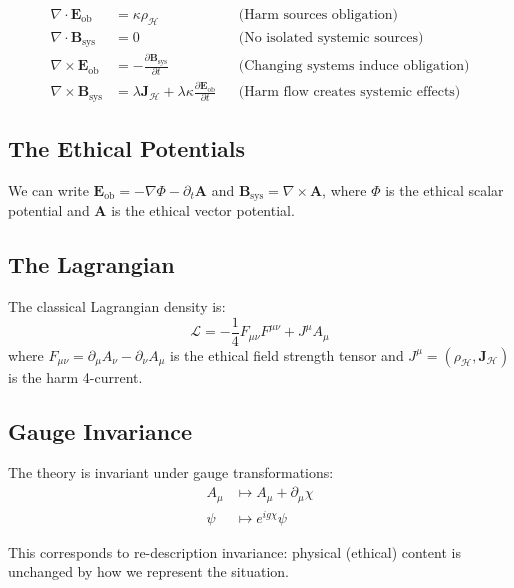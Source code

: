 \documentclass[12pt]{article}
\begin{document}
\begin{align}
    \nabla \cdot \mathbf{E}_{\mathrm{ob}} &= \kappa \rho_{\mathcal{H}} & &\text{(Harm sources obligation)} \\
    \nabla \cdot \mathbf{B}_{\mathrm{sys}} &= 0 & &\text{(No isolated systemic sources)} \\
    \nabla \times \mathbf{E}_{\mathrm{ob}} &= -\frac{\partial \mathbf{B}_{\mathrm{sys}}}{\partial t} & &\text{(Changing systems induce obligation)} \\
    \nabla \times \mathbf{B}_{\mathrm{sys}} &= \lambda \mathbf{J}_{\mathcal{H}} + \lambda\kappa \frac{\partial \mathbf{E}_{\mathrm{ob}}}{\partial t} & &\text{(Harm flow creates systemic effects)}
\end{align}

\subsection{The Ethical Potentials}

We can write $\mathbf{E}_{\mathrm{ob}} = -\nabla\Phi - \partial_t \mathbf{A}$ and $\mathbf{B}_{\mathrm{sys}} = \nabla \times \mathbf{A}$, where $\Phi$ is the ethical scalar potential and $\mathbf{A}$ is the ethical vector potential.

\subsection{The Lagrangian}

The classical Lagrangian density is:
\begin{equation}
    \mathcal{L} = -\frac{1}{4} F_{\mu\nu} F^{\mu\nu} + J^\mu A_\mu
\end{equation}
where $F_{\mu\nu} = \partial_\mu A_\nu - \partial_\nu A_\mu$ is the ethical field strength tensor and $J^\mu = (\rho_{\mathcal{H}}, \mathbf{J}_{\mathcal{H}})$ is the harm 4-current.

\subsection{Gauge Invariance}

The theory is invariant under gauge transformations:
\begin{align}
    A_\mu &\mapsto A_\mu + \partial_\mu \chi \\
    \psi &\mapsto e^{ig\chi} \psi
\end{align}

This corresponds to re-description invariance: physical (ethical) content is unchanged by how we represent the situation.
\end{document}
